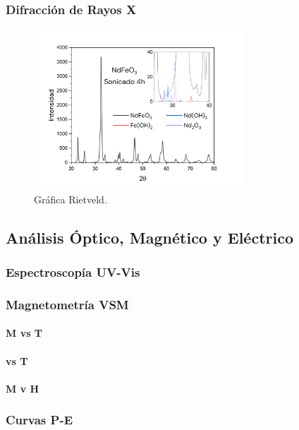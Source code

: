 \documentclass[../main.tex]{subfiles}
\begin{document}
\subsubsection{Difracción de Rayos X} \label{sec:analisisDRX}
\begin{figure}[H]
    \centering
    \includegraphics[width=0.7\textwidth]{fig/drxtemp.png}
    \caption{Gráfica Rietveld.}
    \label{fig:drxrietveld}
\end{figure}

\subsection{Análisis Óptico, Magnético y Eléctrico} \label{sec:analisisoptmagelec}
\subsubsection{Espectroscopía UV-Vis}

\subsubsection{Magnetometría VSM}

\paragraph{M vs T}

\paragraph{\textchi{} vs T}

\paragraph{M v H}
\subsubsection{Curvas P-E}
\end{document}
